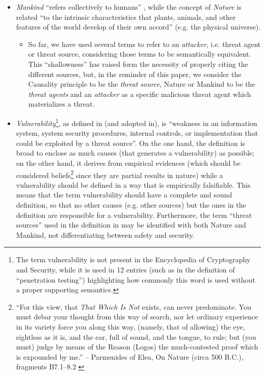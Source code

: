 \begin{itemize}
	\item \emph{Mankind} ``refers collectively to humans''
\autocite{wiki-mankind}, while the concept of \emph{Nature} is
		related ``to the intrinsic characteristics that plants,
		animals, and other features of the world develop of their own
		accord'' (e.g. the physical universe)\autocite{wiki-nature}. 
		\begin{itemize}
			\item So far, we have used several terms to refer to an
				\emph{attacker}, i.e. threat agent or threat source,
				considering those terms to be semantically
				equivalent.  This ``shallowness'' has raised form the
				necessity of properly citing the different sources, but,
				in the reminder of this paper, we consider the
				Causality principle to be the \emph{threat
				source}, Nature or Mankind to be the
				\emph{threat agents} and an \emph{attacker} as
				a specific malicious threat agent which materializes a
				threat.
		\end{itemize}
	\item \emph{Vulnerability}\footnote{The term vulnerability is not
		present in the Encyclopedia of Cryptography and Security, while
		it is used in 12 entries (such as in the definition of
		``penetration testing''\autocite{caddy2005pentest})
		highlighting how commonly this word is used without a proper
		supporting semantics.}, as defined in\autocite{cnssi20104009}
		(and adopted in\autocite{nist2013800-53}), is ``weakness in an
		information system, system security procedures, internal
		controls, or implementation that could be exploited by a threat
		source''. On the one hand, the definition is broad to enclose
		as much causes (that generates a vulnerability) as possible; on
		the other hand, it derives from empirical evidences (which
		should be considered beliefs\footnote{``For this view, that
		\emph{That Which Is Not} exists, can never predominate. You
		must debar your thought from this way of search, nor let
		ordinary experience in its variety force you along this way,
		(namely, that of allowing) the eye, sightless as it is, and the
		ear, full of sound, and the tongue, to rule; but (you must)
		judge by means of the Reason (Logos) the much-contested proof
		which is expounded by me.'' -- Parmenides of Elea, On Nature
		(circa 500 B.C.), fragments B7.1–8.2
		\autocite{Hakim2016philosophy}} since they are partial results in nature) 
		while a vulnerability should
		be defined in a way that is empirically falsifiable. This means
		that the term vulnerability should have a complete and sound
		definition, so that no other causes (e.g.  other sources) but
		the ones in the definition are responsible for a vulnerability.
		Furthermore, the term ``threat sources'' used in the definition
		in\autocite{cnssi20104009} may be identified with both Nature
		and Mankind, not differentiating between safety and security.
\end{itemize}

